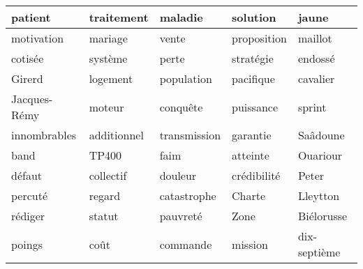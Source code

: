 \begin{tabular}{lllll}
\toprule
      patient &   traitement &       maladie &     solution &         jaune \\
\midrule
   motivation &      mariage &         vente &  proposition &       maillot \\
      cotisée &      système &         perte &    stratégie &       endossé \\
       Girerd &     logement &    population &    pacifique &      cavalier \\
 Jacques-Rémy &       moteur &      conquête &    puissance &        sprint \\
 innombrables &  additionnel &  transmission &     garantie &      Saâdoune \\
         band &        TP400 &          faim &     atteinte &      Ouariour \\
       défaut &    collectif &       douleur &  crédibilité &         Peter \\
      percuté &       regard &   catastrophe &       Charte &      Lleytton \\
      rédiger &       statut &      pauvreté &         Zone &    Biélorusse \\
       poings &         coût &      commande &      mission &  dix-septième \\
\bottomrule
\end{tabular}

